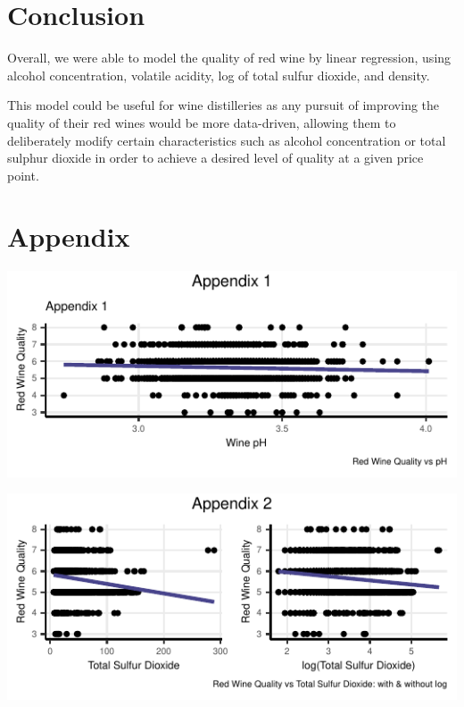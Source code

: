 \documentclass[letterpaper,8pt,twocolumn,twoside,]{pinp}
\begin{document}
\hypertarget{conclusion}{%
\section{Conclusion}\label{conclusion}}

Overall, we were able to model the quality of red wine by linear
regression, using alcohol concentration, volatile acidity, log of total
sulfur dioxide, and density.

This model could be useful for wine distilleries as any pursuit of
improving the quality of their red wines would be more data-driven,
allowing them to deliberately modify certain characteristics such as
alcohol concentration or total sulphur dioxide in order to achieve a
desired level of quality at a given price point.

\pagebreak

\hypertarget{appendix}{%
\section{Appendix}\label{appendix}}

\begin{center}\includegraphics{pinp_files/figure-latex/unnamed-chunk-4-1} \end{center}

\begin{center}\includegraphics{pinp_files/figure-latex/unnamed-chunk-4-2} \end{center}
\end{document}
